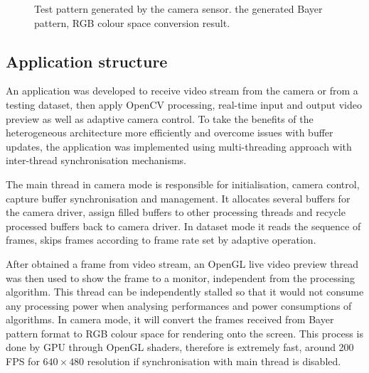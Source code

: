 \begin{figure}[H]
  \centering
  \caption{Test pattern generated by the camera sensor.  the generated Bayer pattern,  RGB colour space conversion result.}
  \label{imp:bayer_eg}
\end{figure}



\subsection{Application structure}

An application was developed to receive video stream from the camera or from a testing dataset, then apply OpenCV processing, real-time input and output video preview as well as adaptive camera control. To take the benefits of the heterogeneous architecture more efficiently and overcome issues with buffer updates, the application was implemented using multi-threading approach with inter-thread synchronisation mechanisms.

The main thread in camera mode is responsible for initialisation, camera control, capture buffer synchronisation and management. It allocates several buffers for the camera driver, assign filled buffers to other processing threads and recycle processed buffers back to camera driver. In dataset mode it reads the sequence of frames, skips frames according to frame rate set by adaptive operation.

After obtained a frame from video stream, an OpenGL live video preview thread was then used to show the frame to a monitor, independent from the processing algorithm. This thread can be independently stalled so that it would not consume any processing power when analysing performances and power consumptions of algorithms. In camera mode, it will convert the frames received from Bayer pattern format to RGB colour space for rendering onto the screen. This process is done by GPU through OpenGL shaders, therefore is extremely fast, around 200 FPS for $640 \times 480$ resolution if synchronisation with main thread is disabled.

